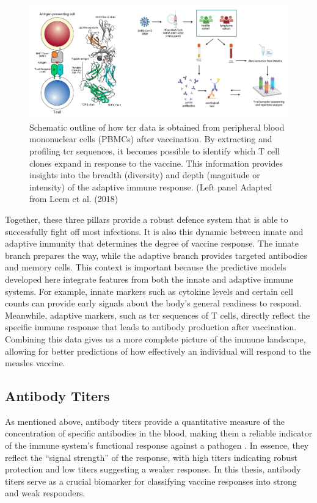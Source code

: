 \documentclass[12pt,a4paper]{report}
\begin{document}
\begin{figure}[h]
  \centering
  \includegraphics[width=1\textwidth]{images/TCR_profiling.png}
  \caption[ \gls{tcr} sequencing Workflow]{Schematic outline of how \gls{tcr} data is obtained from peripheral blood mononuclear cells (PBMCs) after vaccination. By extracting and profiling \gls{tcr} sequences, it becomes possible to identify which T cell clones expand in response to the vaccine. This information provides insights into the breadth (diversity) and depth (magnitude or intensity) of the adaptive immune response. (Left panel Adapted from Leem et al. (2018) \cite{Leem2018IMGTHLA}}
  \label{fig:TCR_profiling}
\end{figure}

\noindent
Together, these three pillars provide a robust defence system that is able to successfully fight off most infections. It is also this dynamic between innate and adaptive immunity that determines the degree of vaccine response. The innate branch prepares the way, while the adaptive branch provides targeted antibodies and memory cells. This context is important because the predictive models developed here integrate features from both the innate and adaptive immune systems. For example, innate markers such as cytokine levels and certain cell counts can provide early signals about the body's general readiness to respond. Meanwhile, adaptive markers, such as \gls{tcr} sequences of T cells, directly reflect the specific immune response that leads to antibody production after vaccination. Combining this data gives us a more complete picture of the immune landscape, allowing for better predictions of how effectively an individual will respond to the measles vaccine.

\subsection{Antibody Titers}
\label{sec:antibody_titers}
As mentioned above, antibody titers provide a quantitative measure of the concentration of specific antibodies in the blood, making them a reliable indicator of the immune system’s functional response against a pathogen \cite{plotkin2010correlates}. In essence, they reflect the “signal strength” of the response, with high titers indicating robust protection and low titers suggesting a weaker response. In this thesis, antibody titers serve as a crucial biomarker for classifying vaccine responses into strong and weak responders.
\end{document}
